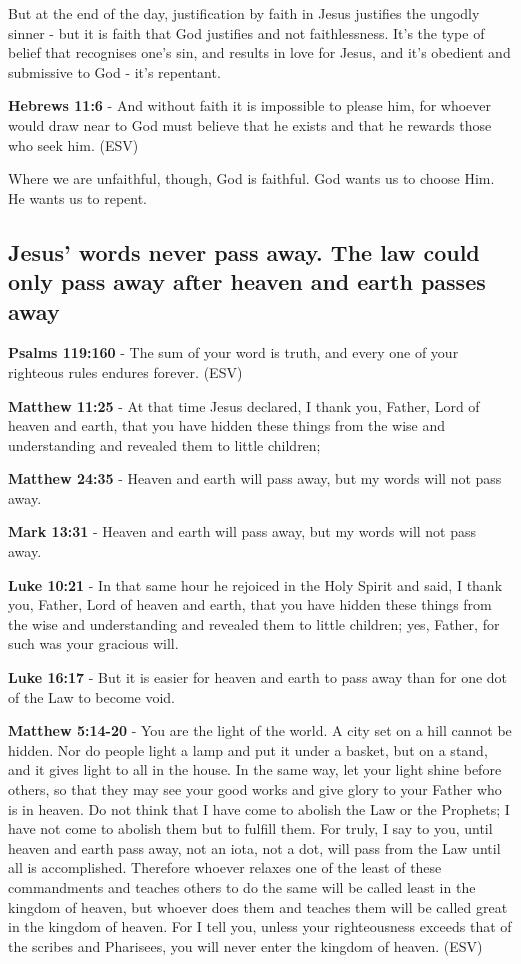 \documentclass[11pt]{article}
\begin{document}
But at the end of the day, justification by faith in Jesus justifies the ungodly sinner - but it is faith that God justifies and not faithlessness. It's the type of belief that recognises one's sin, and results in love for Jesus, and it's obedient and submissive to God - it's repentant.

\textbf{Hebrews 11:6} - And without faith it is impossible to please him, for whoever would draw near to God must believe that he exists and that he rewards those who seek him. (ESV)

Where we are unfaithful, though, God is faithful. God wants us to choose Him. He wants us to repent.

\subsection{Jesus' words never pass away. The law could only pass away after heaven and earth passes away}
\label{sec:orge8f1655}
\textbf{Psalms 119:160} - The sum of your word is truth, and every one of your righteous rules endures forever. (ESV)

\textbf{Matthew 11:25} - At that time Jesus declared, I thank you, Father, Lord of heaven and earth, that you have hidden these things from the wise and understanding and revealed them to little children;

\textbf{Matthew 24:35} - Heaven and earth will pass away, but my words will not pass away.

\textbf{Mark 13:31} - Heaven and earth will pass away, but my words will not pass away.

\textbf{Luke 10:21} - In that same hour he rejoiced in the Holy Spirit and said, I thank you, Father, Lord of heaven and earth, that you have hidden these things from the wise and understanding and revealed them to little children; yes, Father, for such was your gracious will.

\textbf{Luke 16:17} - But it is easier for heaven and earth to pass away than for one dot of the Law to become void.

\textbf{Matthew 5:14-20} - You are the light of the world. A city set on a hill cannot be hidden. Nor do people light a lamp and put it under a basket, but on a stand, and it gives light to all in the house. In the same way, let your light shine before others, so that they may see your good works and give glory to your Father who is in heaven. Do not think that I have come to abolish the Law or the Prophets; I have not come to abolish them but to fulfill them. For truly, I say to you, until heaven and earth pass away, not an iota, not a dot, will pass from the Law until all is accomplished. Therefore whoever relaxes one of the least of these commandments and teaches others to do the same will be called least in the kingdom of heaven, but whoever does them and teaches them will be called great in the kingdom of heaven. For I tell you, unless your righteousness exceeds that of the scribes and Pharisees, you will never enter the kingdom of heaven. (ESV)
\end{document}
